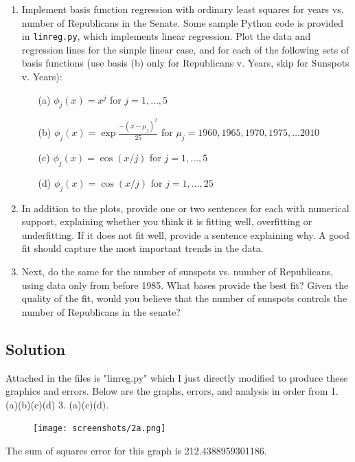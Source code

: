 \documentclass[submit]{harvardml}
\begin{document}
\begin{problem}
\begin{enumerate}
\item Implement basis function regression with ordinary least squares for
years vs. number of Republicans in the Senate. Some sample Python code
is provided in \verb|linreg.py|, which implements linear regression.
Plot the data and regression lines for the simple linear case, and for
each of the following sets of basis functions (use basis (b) only for Republicans v. Years, skip for Sunspots v. Years):
\begin{enumerate}
  \item[(a)] $\phi_j(x) = x^j$ for $j=1, \ldots, 5$ 
    \item[(b)] $\phi_j(x) = \exp{\frac{-(x-\mu_j)^2}{25}}$ for $\mu_j=1960, 1965, 1970, 1975, \ldots 2010$
  \item[(c)] $\phi_j(x) = \cos(x / j)$ for $j=1, \ldots, 5$
  \item[(d)] $\phi_j(x) = \cos(x / j)$ for $j=1, \ldots, 25$
\end{enumerate}

\item In addition to the plots, provide one or two sentences for each with
numerical support, explaining whether you think it is fitting well,
overfitting or underfitting.  If it does not fit well, provide a
sentence explaining why. A good fit should capture the most important
trends in the data.

\item Next, do the same for the number of sunspots vs. number of
Republicans, using data only from before 1985.  What bases provide the
best fit?  Given the quality of the fit, would you believe that the
number of sunspots controls the number of Republicans in the senate?

\end{enumerate}

\end{problem}
\pagebreak
\subsection*{Solution}

Attached in the files is "linreg.py" which I just directly modified to produce these graphics and errors. Below are the graphs, errors, and analysis in order from 1. (a)(b)(c)(d) 3. (a)(c)(d).

\begin{figure}[h]
\centering
\texttt{[image: screenshots/2a.png]}
\end{figure}

\bigskip \noindent The sum of squares error for this graph is 212.4388959301186.
\end{document}
